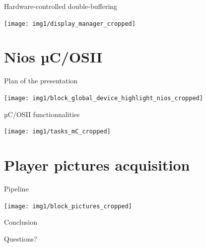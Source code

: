 \documentclass[10pt, notes]{beamer}
\begin{document}
\begin{frame}{Hardware-controlled double-buffering}
    \begin{center}
        \texttt{[image: img1/display\_manager\_cropped]}
    \end{center}
    

\end{frame}

\section{Nios µC/OSII}
\begin{frame}{Plan of the presentation}
    \begin{center}
        \texttt{[image: img1/block\_global\_device\_highlight\_nios\_cropped]}
    \end{center}
\end{frame}

\begin{frame}{µC/OSII functionnalities}
    \begin{center}
        \texttt{[image: img1/tasks\_mC\_cropped]}
    \end{center}
\end{frame}

\section{Player pictures acquisition}

\begin{frame}{Pipeline}
    \begin{center}
        \texttt{[image: img1/block\_pictures\_cropped]}
    \end{center}
\end{frame}

\begin{frame}[standout]
    Conclusion
\end{frame}

\begin{frame}[standout]
    Questions?
\end{frame}

\appendix

%  	
%  	
\end{document}
